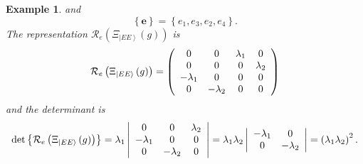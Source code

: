 \documentclass[aps,preprint]{revtex4}%
\newtheorem{example}[theorem]{Example}
\begin{document}
\begin{example}
and
\begin{equation}
\left\{  \mathbf{e}\right\}  =\left\{  e_{1},e_{3},e_{2},e_{4}\right\}  .
\end{equation}
The representation $\mathcal{R}_{e}\left(  \Xi_{\left\vert EE\right\rangle
}\left(  g\right)  \right)  $ is
\begin{equation}
\mathcal{R}_{e}\left(  \Xi_{\left\vert EE\right\rangle }\left(  g\right)
\right)  =\left(
\begin{array}
[c]{cccc}%
0 & 0 & \lambda_{1} & 0\\
0 & 0 & 0 & \lambda_{2}\\
-\lambda_{1} & 0 & 0 & 0\\
0 & -\lambda_{2} & 0 & 0
\end{array}
\right)
\end{equation}
and the determinant is
\begin{equation}
\det\left\{  \mathcal{R}_{e}\left(  \Xi_{\left\vert EE\right\rangle }\left(
g\right)  \right)  \right\}  =\lambda_{1}\left\vert
\begin{array}
[c]{ccc}%
0 & 0 & \lambda_{2}\\
-\lambda_{1} & 0 & 0\\
0 & -\lambda_{2} & 0
\end{array}
\right\vert =\lambda_{1}\lambda_{2}\left\vert
\begin{array}
[c]{cc}%
-\lambda_{1} & 0\\
0 & -\lambda_{2}%
\end{array}
\right\vert =\left(  \lambda_{1}\lambda_{2}\right)  ^{2}.
\end{equation}

\end{example}
\end{document}
